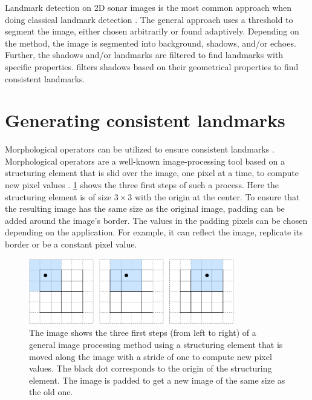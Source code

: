 Landmark detection on 2D sonar images is the most common approach when doing classical landmark detection \cite{Wang2017UnderwaterSonar} \cite{Siantidis2016SideVehicles} \cite{Yuan2016AnNavigation} \cite{Leblond2019SonarProject}. The general approach uses a threshold to segment the image, either chosen arbitrarily or found adaptively. Depending on the method, the image is segmented into background, shadows, and/or echoes. Further, the shadows and/or landmarks are filtered to find landmarks with specific properties. \cite{Leblond2019SonarProject} filters shadows based on their geometrical properties to find consistent landmarks. 

\section{Generating consistent landmarks}

Morphological operators can be utilized to ensure consistent landmarks \cite{Yuan2016AnNavigation}. Morphological operators are a well-known image-processing tool based on a structuring element that is slid over the image, one pixel at a time, to compute new pixel values \cite{Gonzalez2018DigitalProcessing}. \cref{fig:image_processing_basics} shows the three first steps of such a process. Here the structuring element is of size $3\times3$ with the origin at the center. To ensure that the resulting image has the same size as the original image, padding can be added around the image's border. The values in the padding pixels can be chosen depending on the application. For example, it can reflect the image, replicate its border or be a constant pixel value.  

\begin{figure}
    \centering
    \includegraphics[width=0.8\textwidth]{figures/Image_processing_essentials.drawio.pdf}
    \caption{The image shows the three first steps (from left to right) of a general image processing method using a structuring element that is moved along the image with a stride of one to compute new pixel values. The black dot corresponds to the origin of the structuring element. The image is padded to get a new image of the same size as the old one.}
    \label{fig:image_processing_basics}
\end{figure}

